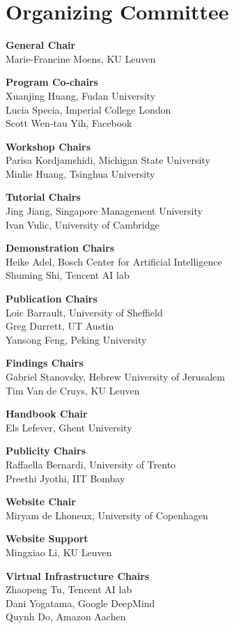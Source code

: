 
\section{Organizing Committee}

\setlength{\parindent}{0pt}

{\bf General Chair} \\
Marie-Francine Moens, KU Leuven

{\bf Program Co-chairs} \\
Xuanjing Huang, Fudan University\\
Lucia Specia, Imperial College London\\
Scott Wen-tau Yih, Facebook

{\bf Workshop Chairs} \\
Parisa Kordjamshidi, Michigan State University\\
Minlie Huang, Tsinghua University

{\bf Tutorial Chairs} \\
Jing Jiang, Singapore Management University \\
Ivan Vulic, University of Cambridge

{\bf Demonstration Chairs} \\
Heike Adel, Bosch Center for Artificial Intelligence \\
Shuming Shi, Tencent AI lab

{\bf Publication Chairs} \\
Loic Barrault, University of Sheffield \\
Greg Durrett, UT Austin \\
Yansong Feng, Peking University

{\bf Findings Chairs} \\
Gabriel Stanovsky, Hebrew University of Jerusalem \\
Tim Van de Cruys, KU Leuven

{\bf Handbook Chair} \\
Els Lefever, Ghent University

{\bf Publicity Chairs} \\
Raffaella Bernardi, University of Trento \\
Preethi Jyothi, IIT Bombay

{\bf Website Chair} \\
Miryam de Lhoneux, University of Copenhagen

{\bf Website Support} \\
Mingxiao Li, KU Leuven

{\bf Virtual Infrastructure Chairs} \\
Zhaopeng Tu, Tencent AI lab\\
Dani Yogatama, Google DeepMind \\
Quynh Do, Amazon Aachen

